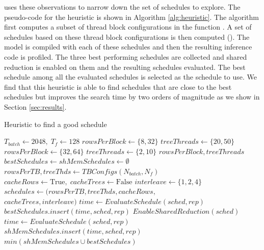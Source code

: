 \Treebeard{} uses these observations to narrow down the set of schedules to explore. 
The pseudo-code for the heuristic is shown in Algorithm \ref{alg:heuristic}.
The algorithm first computes a subset of thread block configurations in the function 
. A set of schedules based on these thread block configurations 
is then computed (). The model is compiled with each of these schedules 
and then the resulting inference code is profiled. The three best performing schedules 
are collected and shared reduction is enabled on them and the resulting schedules evaluated.
The best schedule among all the evaluated schedules is selected as the schedule to use.
We find that this heuristic is able to find schedules that are close to the best schedules
but improves the search time by two orders of magnitude as we show in Section \ref{sec:results}.

\begin{algorithm}
  \caption{Heuristic to find a good schedule}
  \label{alg:heuristic}
  \begin{algorithmic}[1]
    \State $T_{batch} \gets 2048,\; T_f \gets 128$
      \State $rowsPerBlock \gets \{8, 32\}$
      \State $treeThreads \gets \{20, 50\}$
    \Else
      \State $rowsPerBlock \gets \{32, 64\}$
      \State $treeThreads \gets \{2, 10\}$
    \EndIf
    \State \Return $rowsPerBlock, treeThreads$
  \EndProcedure
  \\
  \State $bestSchedules \gets shMemSchedules \gets \emptyset$
  \State $rowsPerTB, treeThds \gets TBConfigs(N_{batch}, N_f)$
  \State $cacheRows \gets \text{True},\; cacheTrees \gets \text{False}$
  \State $interleave \gets \{1, 2, 4\}$
  \State $schedules \gets (rowsPerTB, treeThds, cacheRows,$ \\
                          \hspace{2cm}$cacheTrees, interleave)$
    \State $time \gets EvaluateSchedule(sched, rep)$
    \State $bestSchedules.insert(time, sched, rep)$
  \EndFor
  \State 
    \State $EnableSharedReduction(sched)$
    \State $time \gets EvaluateSchedule(sched, rep)$
    \State $shMemSchedules.insert(time, sched, rep)$
  \EndFor
  \State \Return $min(shMemSchedules \cup bestSchedules)$
  \end{algorithmic} 
\end{algorithm}